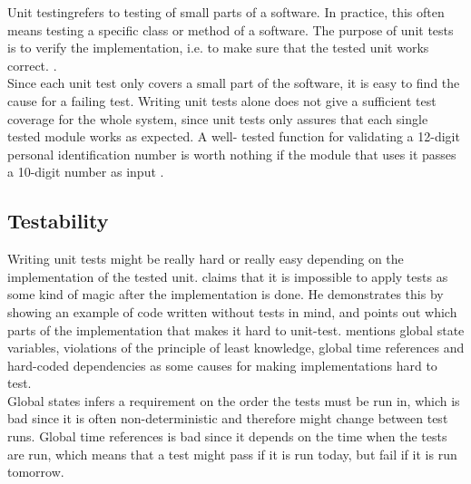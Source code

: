 \MakeShortVerb{\|}


Unit testing\footnotemark refers to testing of small parts of a
software. In practice, this often means testing a specific class or
method of a software. The purpose of unit tests is to verify the
implementation, i.e. to make sure that the tested unit works correct.
\cite{web:xp_unittests, book:pfleeger}.\\

Since each unit test only covers a small part of the software, it is
easy to find the cause for a failing test. Writing unit tests alone does
not give a sufficient test coverage for the whole system, since unit
tests only assures that each single tested module works as expected. A
well- tested function for validating a 12-digit personal identification
number is worth nothing if the module that uses it passes a 10-digit
number as input \cite{wiki:unittests}.\\


\subsection{Testability}

Writing unit tests might be really hard or really easy depending on the
implementation of the tested unit. \citet{video:misko_psychology} claims
that it is impossible to apply tests as some kind of magic after the
implementation is done. He demonstrates this by showing an example of
code written without tests in mind, and points out which parts of the
implementation that makes it hard to unit-test.
\citeauthor{video:misko_psychology} mentions global state variables,
violations of the principle of least knowledge, global time references
and hard-coded dependencies as some causes for making implementations
hard to test.\\

Global states infers a requirement on the order the tests
must be run in, which is bad since it is often non-deterministic and
therefore might change between test runs. Global time references is bad
since it depends on the time when the tests are run, which means that a
test might pass if it is run today, but fail if it is run tomorrow.\\

